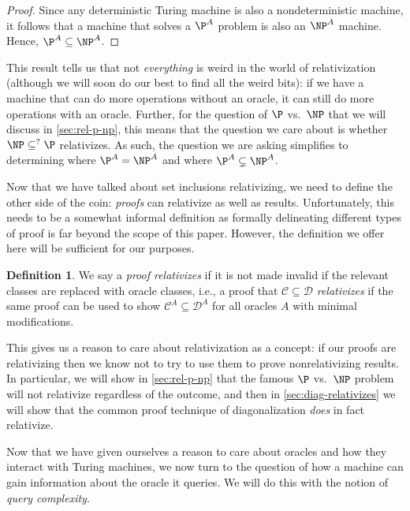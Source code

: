 \documentclass[english]{reedthesis}
\theoremstyle{plain}
\theoremstyle{definition}
\newtheorem{defn}[defn]{Definition}
\theoremstyle{remark}
\begin{document}
\begin{proof}
  Since any deterministic Turing machine is also a nondeterministic machine, it
  follows that a machine that solves a $\P^{A}$ problem is also an $\NP^{A}$
  machine. Hence, $\P^{A} \subseteq \NP^{A}$.
\end{proof}

This result tells us that not \emph{everything} is weird in the world of
relativization (although we will soon do our best to find all the weird bits):
if we have a machine that can do more operations without an oracle, it can still
do more operations with an oracle. Further, for the question of $\P$ vs.\ $\NP$
that we will discuss in \cref{sec:rel-p-np}, this means that the question we
care about is whether $\NP \subseteq^{?} \P$ relativizes. As such, the question we are
asking simplifies to determining where $\P^{A} = \NP^{A}$ and where
$\P^{A} \subsetneq \NP^{A}$.

Now that we have talked about set inclusions relativizing, we need to define the
other side of the coin: \emph{proofs} can relativize as well as results.
Unfortunately, this needs to be a somewhat informal definition as formally
delineating different types of proof is far beyond the scope of this paper.
However, the definition we offer here will be sufficient for our purposes.

\begin{defn}\label{def:relativizing-result}
  We say a \emph{proof relativizes} if it is not made invalid if the relevant
  classes are replaced with oracle classes, i.e., a proof that $\mathcal{C} \subseteq \mathcal{D}$
  \emph{relativizes} if the same proof can be used to show $\mathcal{C}^{A} \subseteq \mathcal{D}^{A}$ for
  all oracles $A$ with minimal modifications.
\end{defn}

This gives us a reason to care about relativization as a concept: if our proofs
are relativizing then we know not to try to use them to prove nonrelativizing
results. In particular, we will show in \cref{sec:rel-p-np} that the famous $\P$
vs.\ $\NP$ problem will not relativize regardless of the outcome, and then in
\cref{sec:diag-relativizes} we will show that the common proof technique of
diagonalization \emph{does} in fact relativize.

Now that we have given ourselves a reason to care about oracles and how they
interact with Turing machines, we now turn to the question of how a machine can
gain information about the oracle it queries. We will do this with the notion of
\emph{query complexity}.
\end{document}
